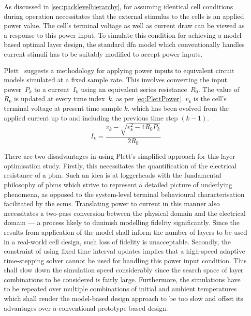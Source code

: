 As  discussed  in  \cref{sec:packlevelhierarchy}, for  assuming  identical  cell
conditions during operation necessitates that the external stimulus to the cells
is an applied power  value. The cell's terminal voltage as  well as current draw
can be viewed as a response to  this power input. To simulate this condition for
achieving a model-based optimal layer design, the standard \gls{dfn} model which
conventionally handles  current stimuli  has to be  suitably modified  to accept
power inputs.

Plett~\cite{Plett2016}  suggests  a methodology  for  applying  power inputs  to
equivalent  circuit models  simulated  at  a fixed  sample  rate. This  involves
converting the input  power~$P_k$ to a current~$I_k$ using  an equivalent series
resistance~$R_0$. The value of $R_0$ is  updated at every time index~$k$, as per
\cref{eq:PlettPower}. $v_k$ is the cell's terminal voltage at present time
sample $k$, which has been evolved from the  applied current up to and including
the previous  time step $(k-1)$.
\begin{equation}\label{eq:PlettPower}
    I_k = \frac{v_k - \sqrt{v^\text{2}_k - 4R_0P_{k}}}{2R_0}
\end{equation}

There are two disadvantages in using  Plett's simplified approach for this layer
optimisation  study.  Firstly,  this  necessitates  the  quantification  of  the
electrical resistance  of a \gls{pbm}. Such  an idea is at  loggerheads with the
fundamental  philosophy of  \glspl{pbm}  which strive  to  represent a  detailed
picture  of  underlying  phenomena,  as opposed  to  the  system-level  terminal
behavioural characterisation  facilitated by the \glspl{ecm}.  Translating power
to current  in this manner also  necessitates a two-pass conversion  between the
physical  domain and  the electrical  domain ---  a process  likely to  diminish
modelling  fidelity significantly.  Since the  results from  application of  the
model shall inform the number of layers  to be used in a real-world cell design,
such loss of  fidelity is unacceptable. Secondly, the constraint  of using fixed
time interval  updates implies that  a high-speed adaptive  time-stepping solver
cannot be used for handling this power input condition. This shall slow down the
simulation speed considerably since the search space of layer combinations to be
considered is  fairly large.  Furthermore, the simulations  have to  be repeated
over  multiple combinations  of  initial and  ambient  temperatures which  shall
render the model-based design approach to  be too slow and offset its advantages
over a conventional prototype-based design.

